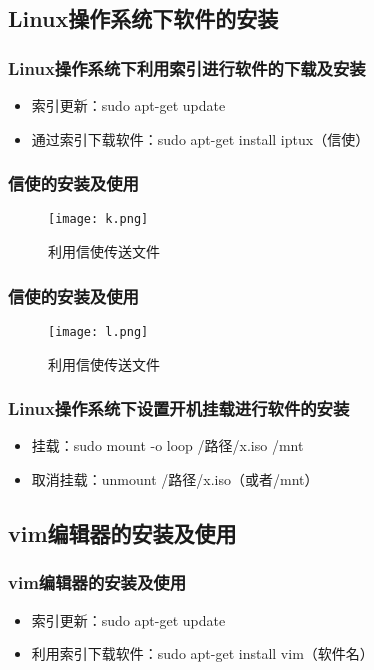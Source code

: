 \documentclass[notheorems,mathserif,table,compress]{beamer}  %
\begin{document}
\subsection{Linux操作系统下软件的安装}

\begin{frame}
  \frametitle{Linux操作系统下利用索引进行软件的下载及安装}
  \begin{itemize}
  \item 索引更新：sudo apt-get update
  \item 通过索引下载软件：sudo apt-get install iptux（信使）
  \end{itemize}
\end{frame}

\begin{frame}
  \frametitle{信使的安装及使用}  
  \begin{figure}[!ht]
  \centering\texttt{[image: k.png]}
  \caption{利用信使传送文件}
  \label{fig:11}
  \end{figure}
\end{frame}

\begin{frame}
  \frametitle{信使的安装及使用}  
  \begin{figure}[!ht]
  \centering\texttt{[image: l.png]}
  \caption{利用信使传送文件}
  \label{fig:12}
  \end{figure}
\end{frame}

\begin{frame} 
  \frametitle{Linux操作系统下设置开机挂载进行软件的安装}
  \begin{itemize}
  \item 挂载：sudo mount -o loop /路径/x.iso /mnt
  \item 取消挂载：unmount /路径/x.iso（或者/mnt）
  \end{itemize}
\end{frame}

\subsection{vim编辑器的安装及使用}

\begin{frame}
  \frametitle{vim编辑器的安装及使用}
  \begin{itemize}
  \item 索引更新：sudo apt-get update
  \item 利用索引下载软件：sudo apt-get install vim（软件名）
  \end{itemize}
\end{frame}
\end{document}
